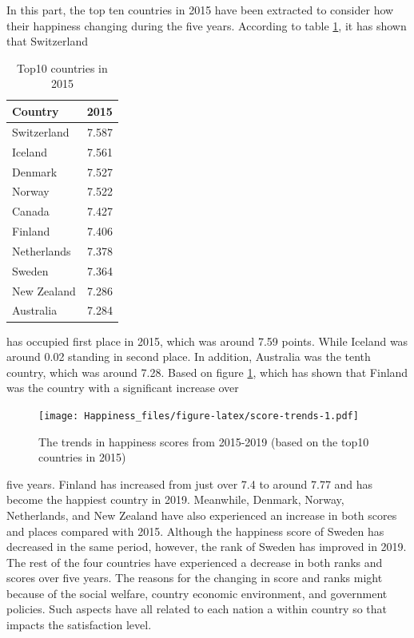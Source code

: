 \documentclass[11pt,a4paper,]{article}
\begin{document}
In this part, the top ten countries in 2015 have been extracted to consider how their happiness changing during the five years. According to table \ref{tab:top10-countries-2015}, it has shown that Switzerland

\begin{table}

\caption{\label{tab:top10-countries-2015}Top10 countries in 2015}
\centering
\begin{tabular}[t]{l|r}
\hline
Country & 2015\\
\hline
Switzerland & 7.587\\
\hline
Iceland & 7.561\\
\hline
Denmark & 7.527\\
\hline
Norway & 7.522\\
\hline
Canada & 7.427\\
\hline
Finland & 7.406\\
\hline
Netherlands & 7.378\\
\hline
Sweden & 7.364\\
\hline
New Zealand & 7.286\\
\hline
Australia & 7.284\\
\hline
\end{tabular}
\end{table}

has occupied first place in 2015, which was around 7.59 points. While Iceland was around 0.02 standing in second place. In addition, Australia was the tenth country, which was around 7.28. Based on figure \ref{fig:score-trends}, which has shown that Finland was the country with a significant increase over

\begin{figure}
\centering
\texttt{[image: Happiness\_files/figure-latex/score-trends-1.pdf]}
\caption{\label{fig:score-trends}The trends in happiness scores from 2015-2019 (based on the top10 countries in 2015)}
\end{figure}

five years. Finland has increased from just over 7.4 to around 7.77 and has become the happiest country in 2019. Meanwhile, Denmark, Norway, Netherlands, and New Zealand have also experienced an increase in both scores and places compared with 2015. Although the happiness score of Sweden has decreased in the same period, however, the rank of Sweden has improved in 2019. The rest of the four countries have experienced a decrease in both ranks and scores over five years. The reasons for the changing in score and ranks might because of the social welfare, country economic environment, and government policies. Such aspects have all related to each nation a within country so that impacts the satisfaction level.
\end{document}

